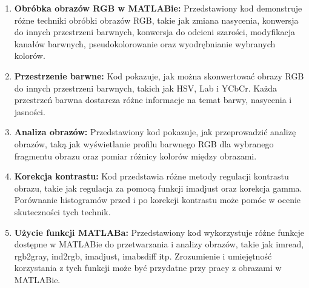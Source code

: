\documentclass[10pt,a4paper,twoside,twocolumn]{article}%
\begin{document}
\begin{enumerate}
    \item \textbf{Obróbka obrazów RGB w MATLABie:} Przedstawiony kod demonstruje różne techniki obróbki obrazów RGB, takie jak zmiana nasycenia, konwersja do innych przestrzeni barwnych, konwersja do odcieni szarości, modyfikacja kanałów barwnych, pseudokolorowanie oraz wyodrębnianie wybranych kolorów.
    \item \textbf{Przestrzenie barwne:} Kod pokazuje, jak można skonwertować obrazy RGB do innych przestrzeni barwnych, takich jak HSV, Lab i YCbCr. Każda przestrzeń barwna dostarcza różne informacje na temat barwy, nasycenia i jasności.
    \item \textbf{Analiza obrazów:} Przedstawiony kod pokazuje, jak przeprowadzić analizę obrazów, taką jak wyświetlanie profilu barwnego RGB dla wybranego fragmentu obrazu oraz pomiar różnicy kolorów między obrazami.
    \item \textbf{Korekcja kontrastu:} Kod przedstawia różne metody regulacji kontrastu obrazu, takie jak regulacja za pomocą funkcji imadjust oraz korekcja gamma. Porównanie histogramów przed i po korekcji kontrastu może pomóc w ocenie skuteczności tych technik.
    \item \textbf{Użycie funkcji MATLABa:} Przedstawiony kod wykorzystuje różne funkcje dostępne w MATLABie do przetwarzania i analizy obrazów, takie jak imread, rgb2gray, ind2rgb, imadjust, imabsdiff itp. Zrozumienie i umiejętność korzystania z tych funkcji może być przydatne przy pracy z obrazami w MATLABie.
\end{enumerate}
\end{document}
